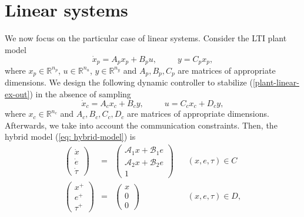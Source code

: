 \documentclass[a4paper, 9pt, twocolumn]{IEEEtran}
\theoremstyle{plain}
\theoremstyle{definition}
\newcommand{\R}[2]{\ensuremath{\mathbb{R}^{#1}_{#2}}}
\begin{document}
\section{Linear systems}\label{sec: application-linear}
We now focus on the particular case of linear systems. Consider the LTI plant model
\begin{equation}\label{plant-linear-ex-out}
\dot{x}_{p} = A_{p}x_{p} + B_{p}u, \hspace{30pt} y = C_{p}x_{p},
\end{equation}
where $x_{p}\in \R{n_{p}}{}$, $u\in \R{n_{u}}{}$, $y\in \R{n_{y}}{}$ and $A_{p}, B_{p}, C_{p}$ are matrices of appropriate dimensions. We design the following dynamic controller to stabilize (\ref{plant-linear-ex-out}) in the absence of sampling
\begin{equation}\label{controller-linear-ex-out}
\dot{x}_{c} = A_{c}x_{c} + B_{c}y, \hspace{30pt} u = C_{c}x_{c} + D_{c}y,
\end{equation}
where $x_{c} \in \R{n_{c}}{}$ and $A_{c}, B_{c}, C_{c}, D_{c}$ are matrices of appropriate dimensions. Afterwards, we take into account the communication constraints. Then, the hybrid model (\ref{eq: hybrid-model}) is
\begin{equation} \label{eq: hybrid-model-linear}
\begin{array}{rllllll}
\left(\begin{array}{c} \dot{x}\\ \dot{e}\\ \dot{\tau}\end{array} \right) &=& \left(\begin{array}{c} \mathcal{A}_{1}x + \mathcal{B}_{1}e\\ \mathcal{A}_{2}x +  \mathcal{B}_{2}e\\ 1\end{array} \right) &\hspace{10pt} (x,e,\tau)\in C \\[15pt]
\left(\begin{array}{c} x^{+}\\ e^{+}\\ \tau^{+}\end{array} \right) &=& \left(\begin{array}{c} x\\ 0\\ 0\end{array} \right) &\hspace{10pt} (x,e,\tau) \in D,
\end{array}
\end{equation}
\end{document}
